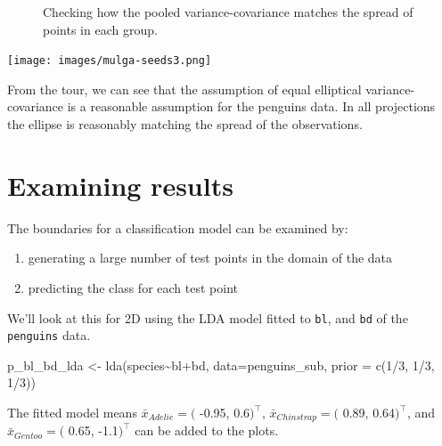 \documentclass[
  letterpaper,
]{krantz}
\newenvironment{Shaded}{\begin{snugshade}}{\end{snugshade}}
\newcommand{\AttributeTok}[1]{\textcolor[rgb]{0.40,0.45,0.13}{#1}}
\newcommand{\DecValTok}[1]{\textcolor[rgb]{0.68,0.00,0.00}{#1}}
\newcommand{\FunctionTok}[1]{\textcolor[rgb]{0.28,0.35,0.67}{#1}}
\newcommand{\NormalTok}[1]{\textcolor[rgb]{0.00,0.23,0.31}{#1}}
\newcommand{\OtherTok}[1]{\textcolor[rgb]{0.00,0.23,0.31}{#1}}
\newcommand{\SpecialCharTok}[1]{\textcolor[rgb]{0.37,0.37,0.37}{#1}}
\providecommand{\tightlist}{%
  \setlength{\itemsep}{0pt}\setlength{\parskip}{0pt}}\usepackage{longtable,booktabs,array}
\newcommand{\insightbox}[1]{%
\noindent\colorbox{insight!30}{%
\begin{minipage}{0.98\textwidth}%
    \centering%
    \begin{minipage}[c]{0.15\textwidth} %
      \texttt{[image: images/mulga-seeds3.png]} %
    \end{minipage}%
    \hfill %
    \begin{minipage}[c]{0.8\textwidth} %
      \bigskip%
      \textsf{#1}%
      \bigskip%
    \end{minipage}%
    \hspace*{3mm}%
  \end{minipage}%
}%
}
\begin{document}
\begin{figure}
\begin{minipage}[t]{0.50\linewidth}
{{}

}

\end{minipage}%

\caption{\label{fig-penguins-lda-pooled-pdf}Checking how the pooled
variance-covariance matches the spread of points in each group.}

\end{figure}

\insightbox{From the tour, we can see that the assumption of equal elliptical variance-covariance is a reasonable assumption for the penguins data. In all projections the ellipse is reasonably matching the spread of the observations.
}

\hypertarget{examining-results}{%
\section{Examining results}\label{examining-results}}

The boundaries for a classification model can be examined by:

\begin{enumerate}
\def\labelenumi{\arabic{enumi}.}
\tightlist
\item
  generating a large number of test points in the domain of the data
\item
  predicting the class for each test point
\end{enumerate}

We'll look at this for 2D using the LDA model fitted to \texttt{bl}, and
\texttt{bd} of the \texttt{penguins} data.

\begin{Shaded}
\begin{Highlighting}[]
\NormalTok{p\_bl\_bd\_lda }\OtherTok{\textless{}{-}} \FunctionTok{lda}\NormalTok{(species}\SpecialCharTok{\textasciitilde{}}\NormalTok{bl}\SpecialCharTok{+}\NormalTok{bd, }\AttributeTok{data=}\NormalTok{penguins\_sub, }
                                  \AttributeTok{prior =} \FunctionTok{c}\NormalTok{(}\DecValTok{1}\SpecialCharTok{/}\DecValTok{3}\NormalTok{, }\DecValTok{1}\SpecialCharTok{/}\DecValTok{3}\NormalTok{, }\DecValTok{1}\SpecialCharTok{/}\DecValTok{3}\NormalTok{))}
\end{Highlighting}
\end{Shaded}

The fitted model means \(\bar{x}_{Adelie} = (\) -0.95, 0.6\()^\top\),
\(\bar{x}_{Chinstrap} = (\) 0.89, 0.64\()^\top\), and
\(\bar{x}_{Gentoo} = (\) 0.65, -1.1\()^\top\) can be added to the plots.
\end{document}
